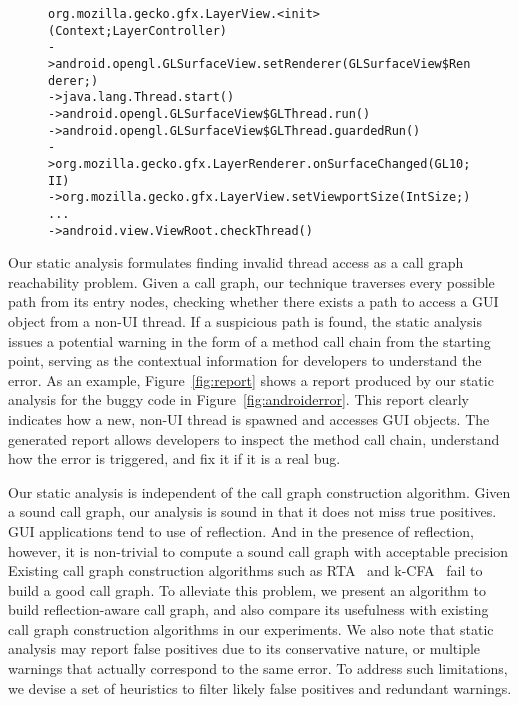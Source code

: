 \begin{figure}[t]
\begin{CodeOut}
\begin{alltt}

   org.mozilla.gecko.gfx.LayerView.<init>(Context;LayerController)
-> android.opengl.GLSurfaceView.setRenderer(GLSurfaceView\$Renderer;)
-> java.lang.Thread.start()
-> android.opengl.GLSurfaceView\$GLThread.run()
-> android.opengl.GLSurfaceView\$GLThread.guardedRun()
-> org.mozilla.gecko.gfx.LayerRenderer.onSurfaceChanged(GL10;II)
-> org.mozilla.gecko.gfx.LayerView.setViewportSize(IntSize;)
   ... 
-> android.view.ViewRoot.checkThread()
\end{alltt}
\end{CodeOut}
\vspace*{-2.0ex}  %
\end{figure}

Our static analysis formulates finding invalid thread access as a call graph reachability
problem. Given a call graph, our technique traverses
every possible path from its entry nodes, checking whether
there exists a path to access a GUI object from a non-UI thread. If 
a suspicious path is found,
the static analysis issues a potential warning in the form of a method
call chain from the starting point, serving as the contextual information
for developers to understand the error.
As an example, Figure~\ref{fig:report} shows a report produced
by our static analysis for the buggy code in Figure~\ref{fig:androiderror}.
This report clearly indicates how a new, non-UI thread is spawned and
accesses GUI objects. The generated report allows  developers to
inspect the method call chain, understand how the error
is triggered, and fix it if it is a real bug.

Our static analysis is independent of the call graph construction algorithm.
Given a sound call graph, our analysis is sound in that it does
not miss true positives. GUI applications tend to use of reflection. And
in the presence of reflection, however, it is
non-trivial to compute a sound call graph with acceptable precision
Existing call graph construction algorithms such as RTA~\cite{rta}
and k-CFA~\cite{kcfa} fail to build a good call graph.
To alleviate this problem, we present an algorithm to build reflection-aware call graph, and
also compare its usefulness with existing call graph construction algorithms in
our experiments. We also note that static analysis may report false positives due to its
conservative nature, or multiple warnings that actually correspond
to the same error. To address such limitations, we devise a set
 of heuristics to filter likely false positives and redundant warnings.


